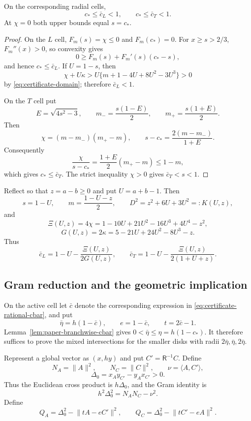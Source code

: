 \begin{lemma}
\label{lem:paper-branchwise-cbar}
On the corresponding radial cells,
\[
 c_*\le\bar c_L<1,\qquad c_*\le\bar c_T<1.
\]
At $\chi=0$ both upper bounds equal $s=c_*$.
\end{lemma}

\begin{proof}
On the $L$ cell, $F_m(s)=\chi\le0$ and $F_m(c_*)=0$.  For $x\ge s>2/3$,
$F_m''(x)>0$, so convexity gives
\[
 0\ge F_m(s)+F_m'(s)(c_*-s),
\]
and hence $c_*\le\bar c_L$.  If $U=1-s$, then
\[
 \chi+U\kappa
 >U\{m+1-4U+8U^2-3U^3\}>0
\]
by \eqref{eq:certificate-domain}; therefore $\bar c_L<1$.

On the $T$ cell put
\[
 E=\sqrt{4s^2-3},\qquad
 m_-=\frac{s(1-E)}2,\qquad m_+=\frac{s(1+E)}2.
\]
Then
\[
 \chi=(m-m_-)(m_+-m),\qquad
 s-c_*=\frac{2(m-m_-)}{1+E}.
\]
Consequently
\[
 \frac{\chi}{s-c_*}
 =\frac{1+E}{2}(m_+-m)\le1-m,
\]
which gives $c_*\le\bar c_T$.  The strict inequality $\chi>0$ gives
$\bar c_T<s<1$.
\end{proof}

Reflect so that $z=a-b\ge0$ and put $U=a+b-1$.  Then
\[
 s=1-U,\qquad m=\frac{1-U-z}{2},\qquad
 D^2=z^2+6U+3U^2=:K(U,z),
\]
and
\[
 \Xi(U,z)=4\chi
 =1-10U+21U^2-16U^3+4U^4-z^2,
\]
\[
 G(U,z)=2\kappa=5-21U+24U^2-8U^3-z.
\]
Thus
\begin{equation}
 \bar c_L=1-U-\frac{\Xi(U,z)}{2G(U,z)},
 \qquad
 \bar c_T=1-U-\frac{\Xi(U,z)}{2(1+U+z)}.
 \label{eq:certificate-rational-cbar}
\end{equation}

\subsection{Gram reduction and the geometric implication}

On the active cell let $\bar c$ denote the corresponding expression in
\eqref{eq:certificate-rational-cbar}, and put
\[
 \bar\eta=h(1-\bar c),\qquad e=1-\bar c,\qquad t=2\bar c-1.
\]
Lemma~\ref{lem:paper-branchwise-cbar} gives
$0<\bar\eta\le\eta=h(1-c_*)$.  It therefore suffices to prove the mixed
intersections for the smaller disks with radii $2\bar\eta,\bar\eta,2\bar\eta$.

Represent a global vector as $(x,hy)$ and put $C'=\mathsf R^{-1}C$.  Define
\[
 N_A=\lVert A\rVert^2,\qquad N_C=\lVert C\rVert^2,\qquad
 \nu=\langle A,C'\rangle,
\]
\[
 \Delta_0=x_Ay_{C'}-y_Ax_{C'}>0.
\]
Thus the Euclidean cross product is $h\Delta_0$, and the Gram identity is
\begin{equation}
 h^2\Delta_0^2=N_AN_C-\nu^2.
 \label{eq:certificate-Gram}
\end{equation}
Define
\begin{equation}
 Q_A=\Delta_0^2-\lVert tA-eC'\rVert^2,\qquad
 Q_C=\Delta_0^2-\lVert tC'-eA\rVert^2.
 \label{eq:certificate-Q}
\end{equation}

